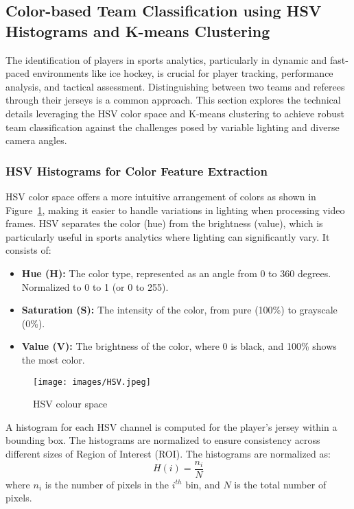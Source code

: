 \documentclass[12pt, letterpaper]{article}
\begin{document}
{
\setlength{\parskip}{0.3cm}
\subsection{Color-based Team Classification using HSV Histograms and K-means Clustering}
\begin{spacing}{1.2}

The identification of players in sports analytics, particularly in dynamic and fast-paced environments like ice hockey, is crucial for player tracking, performance analysis, and tactical assessment. Distinguishing between two teams and referees through their jerseys is a common approach. This section explores the technical details leveraging the HSV color space and K-means clustering to achieve robust team classification against the challenges posed by variable lighting and diverse camera angles.

\subsubsection{HSV Histograms for Color Feature Extraction}

HSV color space offers a more intuitive arrangement of colors as shown in Figure~\ref{fig:HSV}, making it easier to handle variations in lighting when processing video frames. HSV separates the color (hue) from the brightness (value), which is particularly useful in sports analytics where lighting can significantly vary. It consists of:
\begin{itemize}
    \item \textbf{Hue (H):} The color type, represented as an angle from 0 to 360 degrees. Normalized to 0 to 1 (or 0 to 255).
    \item \textbf{Saturation (S):} The intensity of the color, from pure (100\%) to grayscale (0\%).
    \item \textbf{Value (V):} The brightness of the color, where 0 is black, and 100\% shows the most color.
\end{itemize}

\begin{figure}[htbp]
\centering
\texttt{[image: images/HSV.jpeg]}
\captionsetup{font=large}
\caption{HSV colour space}
\label{fig:HSV}
\end{figure}

A histogram for each HSV channel is computed for the player's jersey within a bounding box. The histograms are normalized to ensure consistency across different sizes of Region of Interest (ROI). The histograms are normalized as:
\[ H(i) = \frac{n_i}{N} \]
where \(n_i\) is the number of pixels in the $i^{th}$ bin, and \(N\) is the total number of pixels. 


\end{spacing}}
\end{document}
